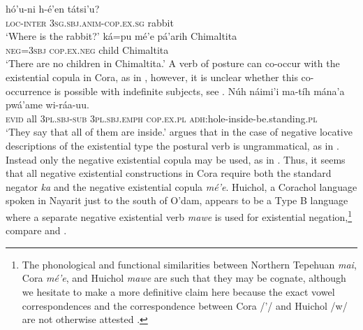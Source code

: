 \documentclass[output=paper,draft,draftmode,colorlinks,citecolor=brown]{langscibook}
\begin{document}
\ea
\label{ex:odam-crposcop}
\gll hó’u-ni h-é’en tátsi'u?\\
\textsc{loc-inter} \textsc{3sg.sbj.anim-cop.ex.sg} rabbit\\
\glt `Where is the rabbit?' \citep[139]{vazquez2013}
\z
\ea
\label{ex:odam-crnokids}
\gll ká=pu mé’e pá’arih Chimaltita\\
\textsc{neg=3sbj} \textsc{cop.ex.neg} child Chimaltita\\
\glt ‘There are no children in Chimaltita.’ \citep[165]{vazquez2013}
\z
A verb of posture can co-occur with the existential copula in Cora, as in , however, it is unclear whether this co-occurrence is possible with indefinite subjects, see \citep[180ff]{vazquez2013}.
\ea 
\label{ex:odam-allinside}
\gll Núh 	náimi’i 	ma-tíh 		mána’a pwá’ame 	wi-ráa-uu.\\
\textsc{evid} all	\textsc{3pl.sbj-sub} \textsc{3pl.sbj.emph} \textsc{cop.ex.pl} \textsc{adh}:hole-inside-be.standing.\textsc{pl}\\
\glt ‘They say that all of them are inside.’
\citep[181]{vazquez2013}
\z 
\citet[181]{vazquez2013} argues that in the case of negative locative descriptions of the existential type the postural verb is ungrammatical, as in . Instead only the negative existential copula may be used, as in . Thus, it seems that all negative existential constructions in Cora require both the standard negator \emph{ka} and the negative existential copula \emph{mé'e}.
\z 
{}
\z 
Huichol, a Corachol language spoken in Nayarit just to the south of O’dam, appears to be a Type B language where a separate negative existential verb \emph{mawe} is used for existential negation,\footnote{The phonological and functional similarities between Northern Tepehuan \emph{mai}, Cora \emph{mé'e}, and Huichol \emph{mawe} are such that they may be cognate, although we hesitate to make a more definitive claim here because the exact vowel correspondences and the correspondence between Cora /'/ and Huichol /w/ are not otherwise attested \citep{stubbs2011}.} compare  and .
\end{document}
